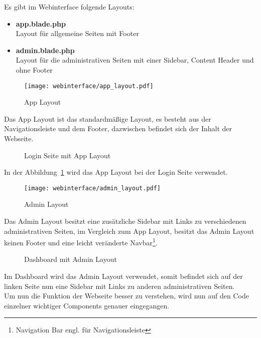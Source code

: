 Es gibt im Webinterface folgende Layouts:

\begin{itemize}
  \item \textbf{app.blade.php}\\
  Layout für allgemeine Seiten mit Footer
  \item \textbf{admin.blade.php}\\
  Layout für die administrativen Seiten mit einer Sidebar, Content Header und
  ohne Footer
\end{itemize}

\begin{figure}[H]
  \centering
  \texttt{[image: webinterface/app\_layout.pdf]}
  \caption{App Layout}
\end{figure}

Das App Layout ist das standardmäßige Layout, es besteht aus der
Navigationsleiste und dem Footer, dazwischen befindet sich der Inhalt der Webseite.

\begin{figure}[H]
  \centering
  \caption{Login Seite mit App Layout}
  \label{fig:login_site}
\end{figure}

In der Abbildung~\ref{fig:login_site} wird das App Layout bei der Login Seite verwendet.

\begin{figure}[H]
  \centering
  \texttt{[image: webinterface/admin\_layout.pdf]}
  \caption{Admin Layout}
\end{figure}

Das Admin Layout besitzt eine zusätzliche Sidebar mit Links zu verschiedenen
administrativen Seiten, im Vergleich zum App Layout, besitzt das Admin
Layout keinen Footer und eine leicht veränderte Navbar\footnote{Navigation Bar
engl. für Navigationsleiste}.

\begin{figure}[H]
  \centering
  \caption{Dashboard mit Admin Layout}
\end{figure}

Im Dashboard wird das Admin Layout verwendet, somit befindet sich auf der linken
Seite nun eine Sidebar mit Links zu anderen administrativen Seiten.\\

Um nun die Funktion der Webseite besser zu verstehen, wird nun auf den Code
einzelner wichtiger Components genauer eingegangen.

